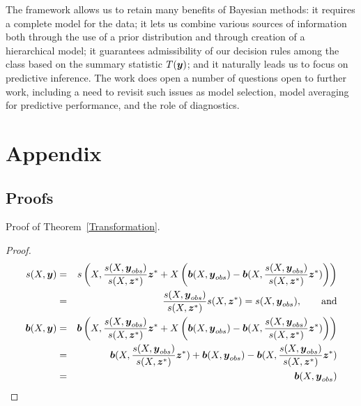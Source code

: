 \documentclass[ba]{imsart}
\newcommand{\by}{\mbox{\boldmath $y$}}
\newcommand{\bz}{\mbox{\boldmath $z$}}
\newcommand{\bb}{\mbox{\boldmath $b$}}
\newcommand{\green}[1]{{\color{green}#1}}
\begin{document}
The framework allows us to retain many benefits of Bayesian methods:  it requires a complete model for the data; it lets us combine various sources of information both through the use of a prior distribution and through creation of a hierarchical model; it guarantees admissibility of our decision rules among the class based on the summary statistic $T(\by)$; and it naturally leads us to focus on predictive inference.  The work does open a number of questions open to further work, including a need to revisit such issues as model selection, model averaging for predictive performance, and the role of diagnostics. 




\section{Appendix}
\label{sec:appendix}
\subsection{Proofs}
\noindent

Proof of Theorem~\ref{Transformation}.  
\begin{proof} 
\begin{eqnarray}
 s(X,\by) & = & s\left(X,\frac{s(X,\by_{obs})}{s(X,\bz^*)}\bz^* + X\left(\bb(X,\by_{obs}) - \bb(X,\frac{s(X,\by_{obs})}{s(X,\bz^*)}\bz^*)\right)\right) \\
& = & \frac{s(X,\by_{obs})}{s(X,\bz^*)} s(X, \bz^*)= s(X,\by_{obs}) , \qquad \mbox{and} \\
 \bb(X,\by) & = & \bb\left(X,\frac{s(X,\by_{obs})}{s(X,\bz^*)}\bz^* + X\left(\bb(X,\by_{obs}) - \bb(X,\frac{s(X,\by_{obs})}{s(X,\bz^*)}\bz^*)\right)\right) \\
 & = & \bb(X,\frac{s(X,\by_{obs})}{s(X,\bz^*)}\bz^*) + \bb(X,\by_{obs}) - \bb(X,\frac{s(X,\by_{obs})}{s(X,\bz^*)}\bz^*) \\ &=& \bb(X,\by_{obs})
\end{eqnarray}
\end{proof}
\end{document}
